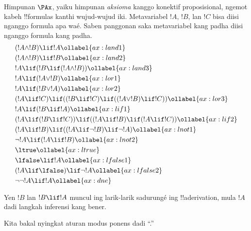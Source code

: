 \documentclass[../../../include/open-logic-section]{subfiles}
\begin{document}
      {}
      {}


\begin{defn}[Aksioma]
Himpunan $\PAx$, yaiku himpunan \emph{aksioma} kanggo konektif
proposisional, ngemot kabeh !!{formula}s kanthi wujud-wujud iki.
Metavariabel $!A$, $!B$, lan $!C$ bisa diisi nganggo formula apa waé.
Saben panggonan saka metavariabel kang padha diisi nganggo formula kang padha.
\begin{align}
  & (!A \land !B) \lif !A \ollabel{ax:land1}\\
  & (!A \land !B) \lif !B \ollabel{ax:land2}\\
  & !A \lif (!B \lif (!A \land !B)) \ollabel{ax:land3}\\
  & !A \lif (!A \lor !B) \ollabel{ax:lor1}\\
  & !A \lif (!B \lor !A) \ollabel{ax:lor2}\\
  & (!A \lif !C) \lif ((!B \lif !C) \lif ((!A \lor !B) \lif !C)) \ollabel{ax:lor3}\\
  & !A \lif (!B \lif !A) \ollabel{ax:lif1}\\
  & (!A \lif (!B \lif !C)) \lif ((!A \lif !B) \lif (!A \lif !C)) \ollabel{ax:lif2}\\
  & (!A \lif !B) \lif ((!A \lif \lnot !B) \lif \lnot !A) \ollabel{ax:lnot1}\\
  & \lnot !A \lif (!A \lif !B) \ollabel{ax:lnot2}\\
  & \ltrue \ollabel{ax:ltrue}\\
  & \lfalse \lif !A \ollabel{ax:lfalse1}\\
  & (!A \lif \lfalse) \lif \lnot !A \ollabel{ax:lfalse2}\\
  & \lnot\lnot !A \lif !A \ollabel{ax:dne}
\end{align}
\end{defn}

\begin{defn}
  Yen $!B$ lan $!B \lif !A$ muncul ing larik-larik sadurungé ing !!a{derivation}, mula
  $!A$ dadi langkah inferensi kang bener.
\end{defn}

Kita bakal nyingkat aturan modus ponens dadi ``\MP.''
\end{document}
